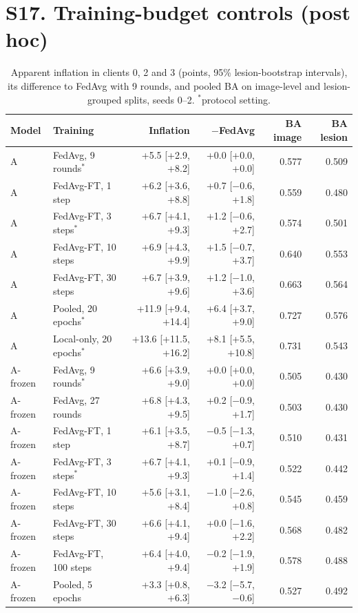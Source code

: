 \documentclass[10pt]{article}
\begin{document}
\section*{S17. Training-budget controls (post hoc)}
\begin{table}[!htbp]
\centering
\scriptsize
\caption{Apparent inflation in clients 0, 2 and 3 (points, 95\% lesion-bootstrap intervals), its difference to FedAvg with 9 rounds, and pooled BA on image-level and lesion-grouped splits, seeds 0--2. $^*$protocol setting.}
\label{tab:s17}
\begin{tabular}{@{}llrrrr@{}}
\toprule
Model & Training & Inflation & $-$FedAvg & BA image & BA lesion \\
\midrule
A & FedAvg, 9 rounds$^*$ & +5.5 [+2.9, +8.2] & +0.0 [+0.0, +0.0] & 0.577 & 0.509 \\
A & FedAvg-FT, 1 step & +6.2 [+3.6, +8.8] & +0.7 [$-$0.6, +1.8] & 0.559 & 0.480 \\
A & FedAvg-FT, 3 steps$^*$ & +6.7 [+4.1, +9.3] & +1.2 [$-$0.6, +2.7] & 0.574 & 0.501 \\
A & FedAvg-FT, 10 steps & +6.9 [+4.3, +9.9] & +1.5 [$-$0.7, +3.7] & 0.640 & 0.553 \\
A & FedAvg-FT, 30 steps & +6.7 [+3.9, +9.6] & +1.2 [$-$1.0, +3.6] & 0.663 & 0.564 \\
A & Pooled, 20 epochs$^*$ & +11.9 [+9.4, +14.4] & +6.4 [+3.7, +9.0] & 0.727 & 0.576 \\
A & Local-only, 20 epochs$^*$ & +13.6 [+11.5, +16.2] & +8.1 [+5.5, +10.8] & 0.731 & 0.543 \\
\midrule
A-frozen & FedAvg, 9 rounds$^*$ & +6.6 [+3.9, +9.0] & +0.0 [+0.0, +0.0] & 0.505 & 0.430 \\
A-frozen & FedAvg, 27 rounds & +6.8 [+4.3, +9.5] & +0.2 [$-$0.9, +1.7] & 0.503 & 0.430 \\
A-frozen & FedAvg-FT, 1 step & +6.1 [+3.5, +8.7] & $-$0.5 [$-$1.3, +0.7] & 0.510 & 0.431 \\
A-frozen & FedAvg-FT, 3 steps$^*$ & +6.7 [+4.1, +9.3] & +0.1 [$-$0.9, +1.4] & 0.522 & 0.442 \\
A-frozen & FedAvg-FT, 10 steps & +5.6 [+3.1, +8.4] & $-$1.0 [$-$2.6, +0.8] & 0.545 & 0.459 \\
A-frozen & FedAvg-FT, 30 steps & +6.6 [+4.1, +9.4] & +0.0 [$-$1.6, +2.2] & 0.568 & 0.482 \\
A-frozen & FedAvg-FT, 100 steps & +6.4 [+4.0, +9.4] & $-$0.2 [$-$1.9, +1.9] & 0.578 & 0.488 \\
A-frozen & Pooled, 5 epochs & +3.3 [+0.8, +6.3] & $-$3.2 [$-$5.7, $-$0.6] & 0.527 & 0.492 \\

\end{tabular}
\end{table}
\end{document}

